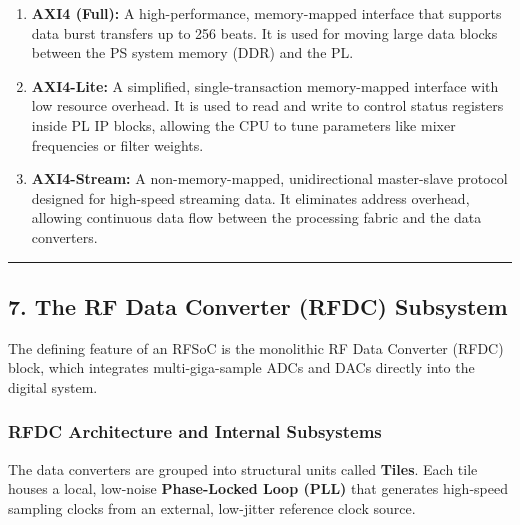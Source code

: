 \documentclass[
]{article}
\providecommand{\tightlist}{%
  \setlength{\itemsep}{0pt}\setlength{\parskip}{0pt}}
\begin{document}
\begin{enumerate}
\def\labelenumi{\arabic{enumi}.}
\tightlist
\item
  \textbf{AXI4 (Full):} A high-performance, memory-mapped interface that
  supports data burst transfers up to 256 beats. It is used for moving
  large data blocks between the PS system memory (DDR) and the PL.
\item
  \textbf{AXI4-Lite:} A simplified, single-transaction memory-mapped
  interface with low resource overhead. It is used to read and write to
  control status registers inside PL IP blocks, allowing the CPU to tune
  parameters like mixer frequencies or filter weights.
\item
  \textbf{AXI4-Stream:} A non-memory-mapped, unidirectional master-slave
  protocol designed for high-speed streaming data. It eliminates address
  overhead, allowing continuous data flow between the processing fabric
  and the data converters.
\end{enumerate}

\begin{center}\rule{0.5\linewidth}{0.5pt}\end{center}

\subsection{7. The RF Data Converter (RFDC)
Subsystem}\label{the-rf-data-converter-rfdc-subsystem}

The defining feature of an RFSoC is the monolithic RF Data Converter
(RFDC) block, which integrates multi-giga-sample ADCs and DACs directly
into the digital system.

\subsubsection{RFDC Architecture and Internal
Subsystems}\label{rfdc-architecture-and-internal-subsystems}

The data converters are grouped into structural units called
\textbf{Tiles}. Each tile houses a local, low-noise \textbf{Phase-Locked
Loop (PLL)} that generates high-speed sampling clocks from an external,
low-jitter reference clock source.
\end{document}
